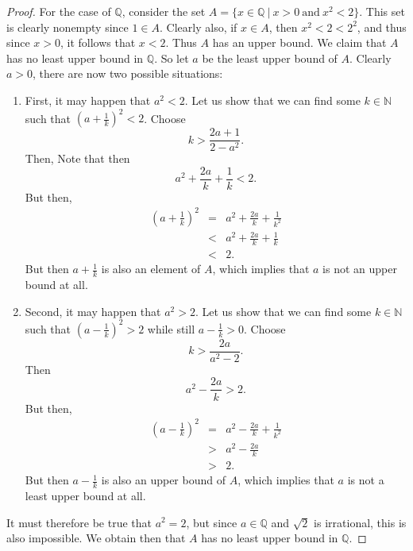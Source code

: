 \begin{proof}
    For the case of $\mathbb{Q}$, consider the set $A = \{x\in \mathbb{Q}~\vert~x>0~\text{and}~x^2<2\}$. This set is clearly nonempty since $1\in A$. Clearly also, if $x\in A$, then $x^2<2<2^2$, and thus since $x>0$, it follows that $x<2$. Thus $A$ has an upper bound. We claim that $A$ has no least upper bound in $\mathbb{Q}$. So let $a$ be the least upper bound of $A$. Clearly $a>0$, there are now two possible situations:
    \begin{enumerate}
        \item First, it may happen that $a^2 < 2$. Let us show that we can find some $k\in \mathbb{N}$ such that $\left(a + \frac{1}{k}\right)^2 < 2$. Choose
        $$k> \frac{2a + 1}{2-a^2}.$$
        Then,        
        Note that then
        $$a^2 + \frac{2a}{k} + \frac{1}{k} < 2.$$
        But then,
        \begin{eqnarray*}
        \left(a + \frac{1}{k}\right)^2
        & = & a^2 + \frac{2a}{k} + \frac{1}{k^2}\\
        & < & a^2 + \frac{2a}{k} + \frac{1}{k}\\
        & < & 2.
        \end{eqnarray*}
        But then $a + \frac{1}{k}$ is also an element of $A$, which implies that $a$ is not an upper bound at all.
        \item Second, it may happen that $a^2 > 2$. Let us show that we can find some $k\in \mathbb{N}$ such that $\left(a - \frac{1}{k}\right)^2>2$ while still $a-\frac{1}{k}>0$. Choose
        $$k>\frac{2a}{a^2 - 2}.$$
        Then
        $$a^2 - \frac{2a}{k}>2.$$
        But then,
        \begin{eqnarray*}
            \left(a - \frac{1}{k}\right)^2
            & = & a^2 - \frac{2a}{k} + \frac{1}{k^2}\\
            & > & a^2 - \frac{2a}{k}\\
            & > & 2.
        \end{eqnarray*}
        But then $a - \frac{1}{k}$ is also an upper bound of $A$, which implies that $a$ is not a least upper bound at all.
    \end{enumerate}
    It must therefore be true that $a^2 = 2$, but since $a\in \mathbb{Q}$ and $\sqrt{2}$ is irrational, this is also impossible. We obtain then that $A$ has no least upper bound in $\mathbb{Q}$.
\end{proof}

